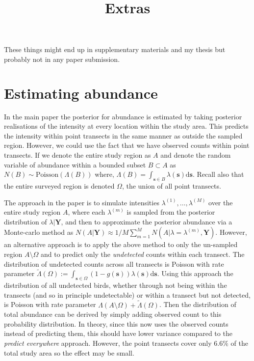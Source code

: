 \documentclass[12pt]{article}
\title{Extras}
\date{}
\newcommand{\intd}{\mathrm{d}}
\newcommand{\bm}{\boldsymbol}  %
\newcommand{\bs}{\boldsymbol{s}}
\begin{document}
	
\maketitle

These things might end up in supplementary materials and my thesis but probably not in any paper submission.

\section*{Estimating abundance}

In the main paper the posterior for abundance is estimated by taking posterior realisations of the intensity at every location within the study area.  This predicts the intensity within point transects in the same manner as outside the sampled region.  However, we could use the fact that we have observed counts within point transects.  If we denote the entire study region as $A$ and denote the random variable of abundance within a bounded subset $B \subset A$ as $N(B) \sim \text{Poisson}(\Lambda(B))$ where, $\Lambda(B) = \int_{\bs \in B} \lambda(\bs) \intd \boldsymbol{s}$.  Recall also that the entire surveyed region is denoted $\Omega$, the union of all point transects.  

The approach in the paper is to simulate intensities $\lambda^{(1)}, \ldots, \lambda^{(M)}$ over the entire study region $A$, where each $\lambda^{(m)}$ is sampled from the posterior distribution of $\lambda | \bm{Y}$, and then to approximate the posterior abundance via a Monte-carlo method as $N(A | \bm{Y}) \approx 1/M \sum_{m=1}^M N(A | \lambda = \lambda^{(m)}, \bm{Y})$.  However, an alternative approach is to apply the above method to only the un-sampled region $A \setminus \Omega$ and to predict only the \textit{undetected} counts within each transect.  The distribution of undetected counts across all transects is Poisson with rate parameter $ \tilde{\Lambda}(\Omega) := \int_{\bs \in \Omega}(1 - g(\bs))\lambda(\bs) \intd \bs$.  Using this approach the distribution of all undetected birds, whether through not being within the transects (and so in principle undetectable) or within a transect but not detected, is Poisson with rate parameter $\Lambda(A \setminus \Omega) + \tilde{\Lambda}(\Omega)$.  Then the distribution of total abundance can be derived by simply adding observed count to this probability distribution.  In theory, since this now uses the observed counts instead of predicting them, this should have lower variance compared to the \textit{predict everywhere} approach.  However, the point transects cover only $6.6\%$ of the total study area so the effect may be small.
\end{document}
